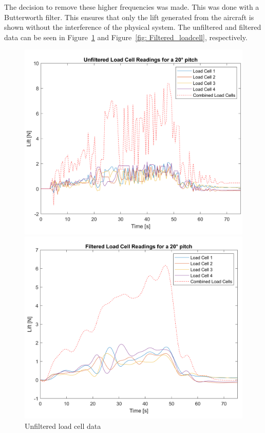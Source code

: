         The decision to remove these higher frequencies was made. This was done with a Butterworth filter. This ensures that only the lift generated from the aircraft is shown without the interference of the physical system. The unfiltered and filtered data can be seen in Figure~\ref{fig: Unfiltered_Loadcell} and Figure~\ref{fig: Filtered_loadcell}, respectively.\\
        \begin{figure}[h] 
            \centering
            \begin{minipage}{0.45\textwidth}
                \centering
                \includegraphics*[width =1.1\textwidth]{figs/Data_Analysis/Unfiltered Loadcell Readings-Test 4.png}
                \caption{Unfiltered load cell data}
                \label{fig: Unfiltered_Loadcell}
            \end{minipage}\hfill 
            \begin{minipage}{0.45\textwidth}
                \centering
                \includegraphics*[width =1.1\textwidth]{figs/Data_Analysis/Lift Generated-Test 4.png}

\end{minipage}
\end{figure}
